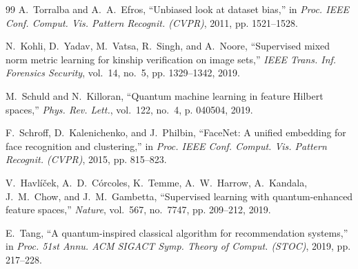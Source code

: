 \documentclass[preprint,12pt]{elsarticle}
\begin{document}
\begin{thebibliography}{99}
A.~Torralba and A.~A.~Efros, ``Unbiased look at dataset bias,'' in \emph{Proc. IEEE Conf. Comput. Vis. Pattern Recognit. (CVPR)}, 2011, pp. 1521--1528.

N.~Kohli, D.~Yadav, M.~Vatsa, R.~Singh, and A.~Noore, ``Supervised mixed norm metric learning for kinship verification on image sets,'' \emph{IEEE Trans. Inf. Forensics Security}, vol.~14, no.~5, pp. 1329--1342, 2019.

M.~Schuld and N.~Killoran, ``Quantum machine learning in feature Hilbert spaces,'' \emph{Phys. Rev. Lett.}, vol.~122, no.~4, p. 040504, 2019.

F.~Schroff, D.~Kalenichenko, and J.~Philbin, ``FaceNet: A unified embedding for face recognition and clustering,'' in \emph{Proc. IEEE Conf. Comput. Vis. Pattern Recognit. (CVPR)}, 2015, pp. 815--823.

V.~Havl{\'i}{\v{c}}ek, A.~D.~C{\'o}rcoles, K.~Temme, A.~W.~Harrow, A.~Kandala, J.~M.~Chow, and J.~M.~Gambetta, ``Supervised learning with quantum-enhanced feature spaces,'' \emph{Nature}, vol.~567, no.~7747, pp. 209--212, 2019.

E.~Tang, ``A quantum-inspired classical algorithm for recommendation systems,'' in \emph{Proc. 51st Annu. ACM SIGACT Symp. Theory of Comput. (STOC)}, 2019, pp. 217--228.

\end{thebibliography}
\end{document}
